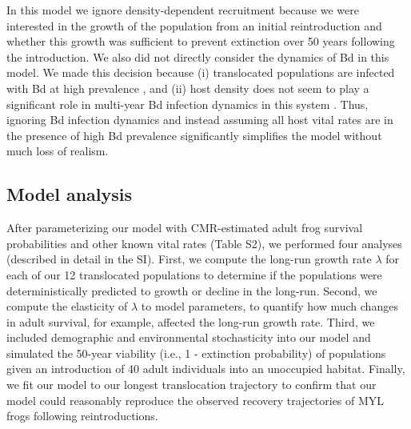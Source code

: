 \documentclass[9pt,twocolumn,twoside,lineno]{pnas-new}
\begin{document}
{In this model we ignore density-dependent recruitment because we were
interested in the growth of the population from an initial
reintroduction and whether this growth was sufficient to prevent
extinction over 50 years following the introduction. We also did not
directly consider the dynamics of Bd in this model. We made this
decision because (i) translocated populations are infected with Bd at
high prevalence \citep{joseph2018}, and (ii) host density does not seem
to play a significant role in multi-year Bd infection dynamics in this
system \citep{wilber2022}. Thus, ignoring Bd infection dynamics and
instead assuming all host vital rates are in the presence of high Bd
prevalence significantly simplifies the model without much loss of
realism.

\hypertarget{model-analysis}{%
\subsection*{Model analysis}\label{model-analysis}}

After parameterizing our model with CMR-estimated adult frog survival
probabilities and other known vital rates (Table S2), we performed four analyses (described in detail in the SI).
First, we compute the long-run growth rate \(\lambda\) for each of our
12 translocated populations to determine if the populations were
deterministically predicted to growth or decline in the long-run.
Second, we compute the elasticity of \(\lambda\) to model parameters, to
quantify how much changes in adult survival, for example, affected the
long-run growth rate. Third, we included demographic and environmental
stochasticity into our model and simulated the 50-year viability (i.e.,
1 - extinction probability) of populations given an introduction of 40
adult individuals into an unoccupied habitat. Finally, we fit our model
to our longest translocation trajectory to confirm that our model could
reasonably reproduce the observed recovery trajectories of MYL frogs
following reintroductions.}


\showmatmethods{} %

\end{document}
